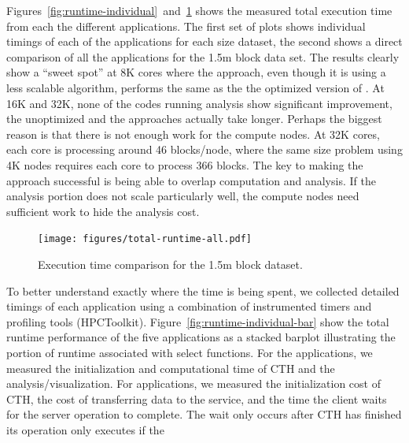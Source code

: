 Figures~\ref{fig:runtime-individual}~and~\ref{fig:runtime-total} shows the
measured total execution time from each the different applications. 
The first set of plots shows individual timings of each of the applications for each 
size dataset, the second shows a direct comparison of all the applications for 
the 1.5m block data set.  The results clearly show a ``sweet spot'' at 8K cores where
the \intransit approach, even though it is using a less scalable algorithm,
performs the same as the the optimized version of \insitu.   At 16K and 32K, none
of the codes running analysis show significant improvement, the unoptimized \insitu and the
\intransit approaches actually take longer.  Perhaps the biggest reason is that there
is not enough work for the compute nodes.  At 32K cores, each core is processing around 
46 blocks/node, where the same size problem using 4K nodes requires each core to process 
366 blocks.  The key to making the \intransit approach successful is being able to 
overlap computation and analysis.   If the analysis portion does not scale particularly
well, the compute nodes need sufficient work to hide the analysis cost. 

\begin{figure}[htb]
\begin{centering}
\texttt{[image: figures/total-runtime-all.pdf]}
\caption{Execution time comparison for the 1.5m block dataset.}
\label{fig:runtime-total}
\par\end{centering}
\end{figure}

To better understand exactly where the time is being spent, we collected
detailed timings of each application using a combination of instrumented timers
and profiling tools (HPCToolkit).  Figure~\ref{fig:runtime-individual-bar} show
the total runtime performance of the five applications as a stacked barplot
illustrating the portion of runtime associated with select functions.  For the
\insitu applications, we measured the initialization and computational time of
CTH and the analysis/visualization.  For \intransit applications, we measured
the initialization cost of CTH, the cost of transferring data to the service,
and the time the client waits for the server operation to complete. The wait
only occurs after CTH has finished its operation only executes if the 

